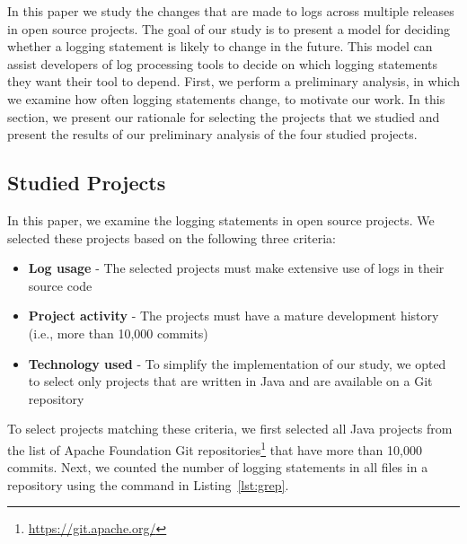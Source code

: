 In this paper we study the changes that are made to logs across multiple releases in open source projects. The goal of our study is to present a model for deciding whether a logging statement is likely to change in the future. This model can assist developers of log processing tools to decide on which logging statements they want their tool to depend. %
First, we perform a preliminary analysis, in which we examine how often logging statements change, to motivate our work. In this section, we present our rationale for selecting the projects that we studied and present the results of our preliminary analysis of the four studied projects. 

\subsection{Studied Projects}
In this paper, we examine the logging statements in open source projects. We selected these projects based on the following three criteria:
\begin{itemize}
	\item \textbf{Log usage} - The selected projects must make extensive use of logs in their source code
	\item \textbf{Project activity} - The projects must have a mature development history (i.e., more than 10,000 commits)
	\item \textbf{Technology used} - To simplify the implementation of our study, we opted to select only projects that are written in Java and are available on a Git repository
\end{itemize}

To select projects matching these criteria, we first selected all Java projects from the list of Apache Foundation Git repositories\footnote{\url{https://git.apache.org/}} that have more than 10,000 commits. Next, we counted the number of logging statements in all  files in a repository using the  command in Listing~\ref{lst:grep}.

